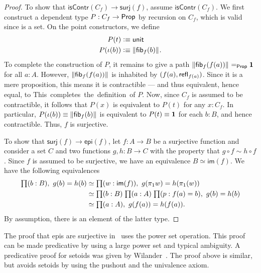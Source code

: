 \begin{proof}
To show that $\mathsf{isContr}(C_f)\to\mathsf{surj}(f)$, assume $\mathsf{isContr}(C_f)$.
We first construct a dependent type $P:C_f\to\mathsf{Prop}$ by recursion on $C_f$, which is valid since \prop is a set.
On the point constructors, we define
\begin{align*}
P(t) & \vcentcolon\equiv \mathsf{unit}\\
P(\iota(b)) & \vcentcolon\equiv \Vert \mathsf{fib}_{f}(b)\Vert_{}.
\end{align*}
To complete the construction of $P$, it remains to give a path $\Vert \mathsf{fib}_{f}(f(a))\Vert_{} =_\mathsf{Prop} \mathbf{1}$ for all $a:A$.
However, $\Vert \mathsf{fib}_{f}(f(a))\Vert_{}$ is inhabited by $(f(a),\mathsf{refl}_{f(a)})$.
Since it is a mere proposition, this means it is contractible --- and thus equivalent, hence equal, to \unit.
This completes the definition of $P$.
Now, since $C_f$ is assumed to be contractible, it follows that $P(x)$ is equivalent to $P(t)$ for any $x:C_f$.
In particular, $P(\iota(b))\equiv \Vert \mathsf{fib}_{f}(b)\Vert_{}$ is equivalent to $P(t)\equiv \mathbf{1}$ for each $b:B$, and hence contractible.
Thus, $f$ is surjective.

To show that $\mathsf{surj}(f)\to\mathsf{epi}(f)$,
let $f:A\to B$ be a surjective function and consider a set $C$ and two functions
$g,h:B\to C$ with the property that $g\circ f\sim h\circ f$. Since $f$ 
is assumed to be surjective,
we have an equivalence $B\simeq\mathsf{im}(f)$. We have the following equivalences
\begin{align*}
\prd{b:B} g(b)= h(b) 
& \simeq \prd{w:\mathsf{im}(f)} g(\pi_1 w)= h(\pi_1(w))\\
& \simeq \prd{b:B}{a:A}{p:f(a)= b} g(b)= h(b)\\
& \simeq \prd{a:A} g(f(a))= h(f(a)).
\end{align*}
By assumption, there is an element of the latter type.
\end{proof}
The proof that epis are surjective in~\cite{Mines/R/R:1988} uses the power set operation. 
This proof can be made predicative by using a large power set and typical ambiguity.
A predicative proof for setoids was given by Wilander~\cite{Wilander2010}. 
The proof above is similar, but avoids setoids by using the pushout and the
univalence axiom. 

